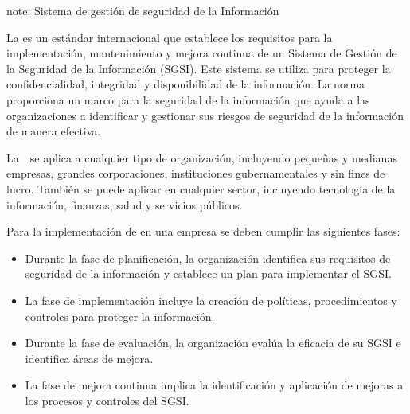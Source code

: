 \documentclass[letterpaper,10pt,spanish]{sphinxmanual}
\begin{document}
\begin{sphinxadmonition}{note}{: Sistema de gestión de seguridad de la Información}

\sphinxAtStartPar
La  es un estándar internacional que establece los requisitos para la implementación, mantenimiento y mejora continua de un Sistema de Gestión de la Seguridad de la Información (SGSI). Este sistema se utiliza para proteger la confidencialidad, integridad y disponibilidad de la información. La norma proporciona un marco para la seguridad de la información que ayuda a las organizaciones a identificar y gestionar sus riesgos de seguridad de la información de manera efectiva.

\sphinxAtStartPar
La  se aplica a cualquier tipo de organización, incluyendo pequeñas y medianas empresas, grandes corporaciones, instituciones gubernamentales y sin fines de lucro. También se puede aplicar en cualquier sector, incluyendo tecnología de la información, finanzas, salud y servicios públicos.

\sphinxAtStartPar
Para la implementación de  en una empresa se deben cumplir las siguientes fases:
\begin{itemize}
\item {} 
\sphinxAtStartPar
{} Durante la fase de planificación, la organización identifica sus requisitos de seguridad de la información y establece un plan para implementar el SGSI.

\item {} 
\sphinxAtStartPar
{} La fase de implementación incluye la creación de políticas, procedimientos y controles para proteger la información.

\item {} 
\sphinxAtStartPar
{} Durante la fase de evaluación, la organización evalúa la eficacia de su SGSI e identifica áreas de mejora.

\item {} 
\sphinxAtStartPar
{} La fase de mejora continua implica la identificación y aplicación de mejoras a los procesos y controles del SGSI.

\end{itemize}
\end{sphinxadmonition}
\end{document}
